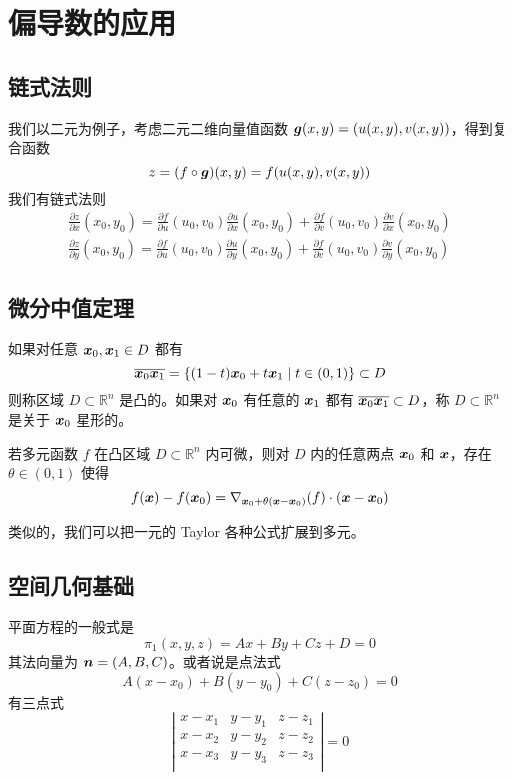\section{偏导数的应用}

\subsection{链式法则}

我们以二元为例子，考虑二元二维向量值函数 $\boldsymbol{g}(x, y) = (u(x, y), v(x, y))$，得到复合函数
\[ z = (f \circ \boldsymbol{g})(x, y) = f(u(x, y), v(x, y)) \]
我们有链式法则
\[ \begin{aligned}
		\frac{\partial z}{\partial x}(x_0, y_0) = \frac{\partial f}{\partial u}(u_0, v_0) \frac{\partial u}{\partial x}(x_0, y_0) + \frac{\partial f}{\partial v}(u_0, v_0)\frac{\partial v}{\partial x}(x_0, y_0) \\
		\frac{\partial z}{\partial y}(x_0, y_0) = \frac{\partial f}{\partial u}(u_0, v_0) \frac{\partial u}{\partial y}(x_0, y_0) + \frac{\partial f}{\partial v}(u_0, v_0)\frac{\partial v}{\partial y}(x_0, y_0)
	\end{aligned} \]

\subsection{微分中值定理}

如果对任意 $\boldsymbol{x}_0, \boldsymbol{x}_1 \in D$ 都有
\[ \overline{\boldsymbol{x}_0 \boldsymbol{x}_1} = \{ (1-t)\boldsymbol{x}_0 + t\boldsymbol{x}_1 \mid t \in (0, 1) \} \subset D \]
则称区域 $D \subset \mathbb{R}^n$ 是凸的。如果对 $\boldsymbol{x}_0$ 有任意的 $\boldsymbol{x}_1$ 都有 $\overline{\boldsymbol{x}_0 \boldsymbol{x}_1} \subset D$，称 $D \subset \mathbb{R}^n$ 是关于 $\boldsymbol{x}_0$ 星形的。

\begin{theorem}
	若多元函数 $f$ 在凸区域 $D \subset \mathbb{R}^n$ 内可微，则对 $D$ 内的任意两点 $\boldsymbol{x}_0$ 和 $\boldsymbol{x}$，存在 $\theta \in (0, 1)$ 使得
	\[ f(\boldsymbol{x}) - f(\boldsymbol{x}_0) = \nabla_{\boldsymbol{x}_0 + \theta(\boldsymbol{x} - \boldsymbol{x}_0)}(f) \cdot (\boldsymbol{x} - \boldsymbol{x}_0) \]
\end{theorem}

类似的，我们可以把一元的 Taylor 各种公式扩展到多元。

\subsection{空间几何基础}

平面方程的一般式是
\[ \pi_1(x, y, z) = Ax + By + Cz + D = 0 \]
其法向量为 $\boldsymbol{n} = (A, B, C)$。或者说是点法式
\[ A(x-x_0) + B(y-y_0) + C(z-z_0) = 0 \]
有三点式
\[ \left|\begin{matrix}
		x - x_1 & y - y_1 & z - z_1 \\
		x - x_2 & y - y_2 & z - z_2 \\
		x - x_3 & y - y_3 & z - z_3 \\
	\end{matrix} \right| = 0 \]

